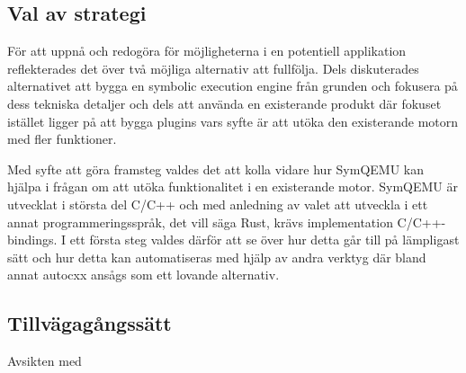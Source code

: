 \subsection{Val av strategi}
För att uppnå och redogöra för möjligheterna i en potentiell applikation reflekterades det över två möjliga 
alternativ att fullfölja. Dels diskuterades alternativet att bygga en symbolic execution engine från grunden och fokusera på
dess tekniska detaljer och dels att använda en existerande produkt där fokuset istället ligger på att bygga plugins vars
syfte är att utöka den existerande motorn med fler funktioner. 

Med syfte att göra framsteg valdes det att kolla vidare hur SymQEMU kan hjälpa i frågan om att utöka funktionalitet
i en existerande motor. SymQEMU är utvecklat i största del C/C++ och med anledning av valet att utveckla i ett annat
programmeringsspråk, det vill säga Rust, krävs implementation C/C++-bindings. I ett första steg valdes därför att 
se över hur detta går till på lämpligast sätt och hur detta kan automatiseras med hjälp av andra verktyg där bland annat 
autocxx ansågs som ett lovande alternativ. 

\subsection{Tillvägagångssätt}

Avsikten med 




%  

